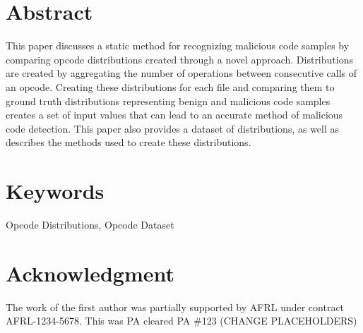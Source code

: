 
\section*{Abstract}
This paper discusses a static method for recognizing malicious code samples by comparing opcode distributions created
through a novel approach.
Distributions are created by aggregating the number of operations between consecutive calls
of an opcode.
Creating these distributions for each file and comparing them to ground truth distributions representing
benign and malicious code samples creates a set of input values that can lead to an accurate
method of malicious code detection.
This paper also provides a dataset of distributions, as well as describes the methods used to create these distributions.

\section*{Keywords}
Opcode Distributions, Opcode Dataset

\section*{Acknowledgment}
The work of the first author was partially supported by AFRL under contract AFRL-1234-5678.
This was PA cleared PA \#123 (CHANGE PLACEHOLDERS)
